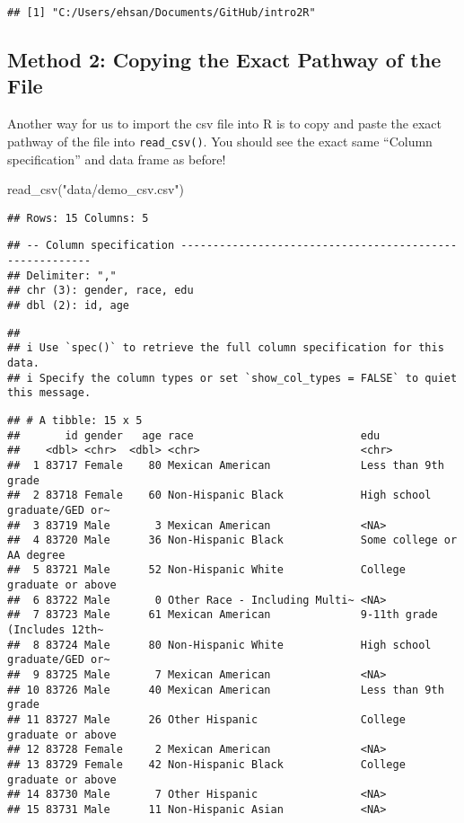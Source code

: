\documentclass[
]{book}
\newenvironment{Shaded}{\begin{snugshade}}{\end{snugshade}}
\newcommand{\FunctionTok}[1]{\textcolor[rgb]{0.00,0.00,0.00}{#1}}
\newcommand{\NormalTok}[1]{#1}
\newcommand{\StringTok}[1]{\textcolor[rgb]{0.31,0.60,0.02}{#1}}
\begin{document}
\begin{verbatim}
## [1] "C:/Users/ehsan/Documents/GitHub/intro2R"
\end{verbatim}

\hypertarget{method-2-copying-the-exact-pathway-of-the-file}{%
\subsection{Method 2: Copying the Exact Pathway of the File}\label{method-2-copying-the-exact-pathway-of-the-file}}

Another way for us to import the csv file into R is to copy and paste the exact pathway of the file into \texttt{read\_csv()}. You should see the exact same ``Column specification'' and data frame as before!

\begin{Shaded}
\begin{Highlighting}[]
\FunctionTok{read\_csv}\NormalTok{(}\StringTok{"data/demo\_csv.csv"}\NormalTok{)}
\end{Highlighting}
\end{Shaded}

\begin{verbatim}
## Rows: 15 Columns: 5
\end{verbatim}

\begin{verbatim}
## -- Column specification --------------------------------------------------------
## Delimiter: ","
## chr (3): gender, race, edu
## dbl (2): id, age
\end{verbatim}

\begin{verbatim}
##
## i Use `spec()` to retrieve the full column specification for this data.
## i Specify the column types or set `show_col_types = FALSE` to quiet this message.
\end{verbatim}

\begin{verbatim}
## # A tibble: 15 x 5
##       id gender   age race                          edu
##    <dbl> <chr>  <dbl> <chr>                         <chr>
##  1 83717 Female    80 Mexican American              Less than 9th grade
##  2 83718 Female    60 Non-Hispanic Black            High school graduate/GED or~
##  3 83719 Male       3 Mexican American              <NA>
##  4 83720 Male      36 Non-Hispanic Black            Some college or AA degree
##  5 83721 Male      52 Non-Hispanic White            College graduate or above
##  6 83722 Male       0 Other Race - Including Multi~ <NA>
##  7 83723 Male      61 Mexican American              9-11th grade (Includes 12th~
##  8 83724 Male      80 Non-Hispanic White            High school graduate/GED or~
##  9 83725 Male       7 Mexican American              <NA>
## 10 83726 Male      40 Mexican American              Less than 9th grade
## 11 83727 Male      26 Other Hispanic                College graduate or above
## 12 83728 Female     2 Mexican American              <NA>
## 13 83729 Female    42 Non-Hispanic Black            College graduate or above
## 14 83730 Male       7 Other Hispanic                <NA>
## 15 83731 Male      11 Non-Hispanic Asian            <NA>
\end{verbatim}
\end{document}
